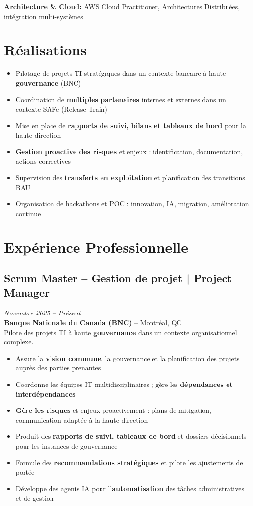 \documentclass[11pt,a4paper]{article}
\begin{document}
\textbf{Architecture \& Cloud:} AWS Cloud Practitioner, Architectures Distribuées, intégration multi-systèmes

\vspace{6pt}

\section*{Réalisations}
\begin{itemize}
    \item Pilotage de projets TI stratégiques dans un contexte bancaire à haute \textbf{gouvernance} (BNC)
    \item Coordination de \textbf{multiples partenaires} internes et externes dans un contexte SAFe (Release Train)
    \item Mise en place de \textbf{rapports de suivi, bilans et tableaux de bord} pour la haute direction
    \item \textbf{Gestion proactive des risques} et enjeux : identification, documentation, actions correctives
    \item Supervision des \textbf{transferts en exploitation} et planification des transitions BAU
    \item Organisation de hackathons et POC : innovation, IA, migration, amélioration continue
\end{itemize}

\section*{Expérience Professionnelle}

\subsection*{Scrum Master -- Gestion de projet | Project Manager} \hfill \textit{Novembre 2025 -- Présent}\\
\textbf{Banque Nationale du Canada (BNC)} -- Montréal, QC\\
Pilote des projets TI à haute \textbf{gouvernance} dans un contexte organisationnel complexe.
\begin{itemize}
    \item Assure la \textbf{vision commune}, la gouvernance et la planification des projets auprès des parties prenantes
    \item Coordonne les équipes IT multidisciplinaires ; gère les \textbf{dépendances et interdépendances}
    \item \textbf{Gère les risques} et enjeux proactivement : plans de mitigation, communication adaptée à la haute direction
    \item Produit des \textbf{rapports de suivi, tableaux de bord} et dossiers décisionnels pour les instances de gouvernance
    \item Formule des \textbf{recommandations stratégiques} et pilote les ajustements de portée
    \item Développe des agents IA pour l'\textbf{automatisation} des tâches administratives et de gestion
\end{itemize}
\end{document}

